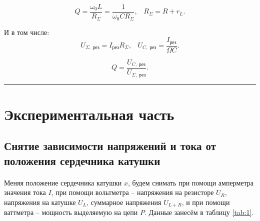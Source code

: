 \documentclass[a4paper,12pt]{article} %
\begin{document}
\begin{equation}
Q = \frac{\omega_0 L}{R_\Sigma} = \frac{1}{\omega_0 C R_\Sigma}, \;\;\; R_\Sigma = R + r_L. \label{7}
\end{equation}

И в том числе:
\begin{equation}
U_{\Sigma, \; \text{рез}} = I_\text{рез} R_\Sigma, \;\;\; U_{C, \; \text{рез}} = \frac{I_\text{рез}}{\Omega C}. \label{9}
\end{equation}

\begin{equation}
Q = \frac{U_{C, \; \text{рез}}}{U_{\Sigma, \; \text{рез}}}. \label{10}
\end{equation}



\medskip\hrule\medskip

\section{Экспериментальная часть}

\subsection{Снятие зависимости напряжений и тока от положения сердечника катушки}

\paragraph{} Меняя положение сердечника катушки $x$, будем снимать при помощи амперметра значения тока $I$, при помощи вольтметра -- напряжения на резисторе $U_R$, напряжения на катушке $U_L$, суммарное напряжения $U_{L+R}$, и при помощи ваттметра -- мощность выделяемую на цепи $P$. Данные занесём в таблицу \ref{tab:1}.
\end{document}

